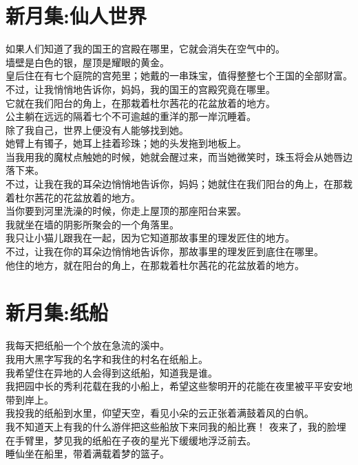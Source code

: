\documentclass[
]{book}
\renewenvironment{quote}{\begin{VF}}{\end{VF}}
\begin{document}
\hypertarget{section-41}{%
\section{新月集:仙人世界}\label{section-41}}

\begin{quote}
如果人们知道了我的国王的宫殿在哪里，它就会消失在空气中的。\\
墙壁是白色的银，屋顶是耀眼的黄金。\\
皇后住在有七个庭院的宫苑里；她戴的一串珠宝，值得整整七个王国的全部财富。\\
不过，让我悄悄地告诉你，妈妈，我的国王的宫殿究竟在哪里。\\
它就在我们阳台的角上，在那栽着杜尔茜花的花盆放着的地方。\\
公主躺在远远的隔着七个不可逾越的重洋的那一岸沉睡着。\\
除了我自己，世界上便没有人能够找到她。\\
她臂上有镯子，她耳上挂着珍珠；她的头发拖到地板上。\\
当我用我的魔杖点触她的时候，她就会醒过来，而当她微笑时，珠玉将会从她唇边落下来。\\
不过，让我在我的耳朵边悄悄地告诉你，妈妈；她就住在我们阳台的角上，在那栽着杜尔茜花的花盆放着的地方。\\
当你要到河里洗澡的时候，你走上屋顶的那座阳台来罢。\\
我就坐在墙的阴影所聚会的一个角落里。\\
我只让小猫儿跟我在一起，因为它知道那故事里的理发匠住的地方。\\
不过，让我在你的耳朵边悄悄地告诉你，那故事里的理发匠到底住在哪里。\\
他住的地方，就在阳台的角上，在那栽着杜尔茜花的花盆放着的地方。
\end{quote}

\hypertarget{section-42}{%
\section{新月集:纸船}\label{section-42}}

\begin{quote}
我每天把纸船一个个放在急流的溪中。\\
我用大黑字写我的名字和我住的村名在纸船上。\\
我希望住在异地的人会得到这纸船，知道我是谁。\\
我把园中长的秀利花载在我的小船上，希望这些黎明开的花能在夜里被平平安安地带到岸上。\\
我投我的纸船到水里，仰望天空，看见小朵的云正张着满鼓着风的白帆。\\
我不知道天上有我的什么游伴把这些船放下来同我的船比赛！ 夜来了，我的脸埋在手臂里，梦见我的纸船在子夜的星光下缓缓地浮泛前去。\\
睡仙坐在船里，带着满载着梦的篮子。
\end{quote}
\end{document}
